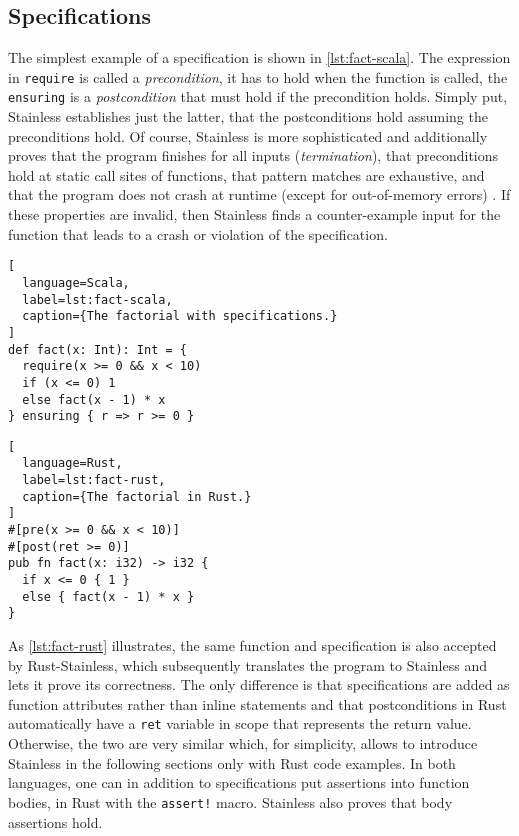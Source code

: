 \subsection{Specifications}

The simplest example of a specification is shown in \autoref{lst:fact-scala}.
The expression in \lstinline!require! is called a \emph{precondition}, it has to
hold when the function is called, the \lstinline!ensuring! is a
\emph{postcondition} that must hold if the precondition holds. Simply put,
Stainless establishes just the latter, that the postconditions hold assuming the
preconditions hold. Of course, Stainless is more sophisticated and additionally
proves that the program finishes for all inputs (\emph{termination}), that
preconditions hold at static call sites of functions, that pattern matches are
exhaustive, and that the program does not crash at runtime (except for
out-of-memory errors) \cite{stainless-doc}. If these properties are invalid,
then Stainless finds a counter-example input for the function that leads to a
crash or violation of the specification.

\noindent\begin{minipage}[t]{.47\textwidth}
\begin{lstlisting}[
  language=Scala,
  label=lst:fact-scala,
  caption={The factorial with specifications.}
]
def fact(x: Int): Int = {
  require(x >= 0 && x < 10)
  if (x <= 0) 1
  else fact(x - 1) * x
} ensuring { r => r >= 0 }
\end{lstlisting}
\end{minipage}\hfill
\begin{minipage}[t]{.47\textwidth}
\begin{lstlisting}[
  language=Rust,
  label=lst:fact-rust,
  caption={The factorial in Rust.}
]
#[pre(x >= 0 && x < 10)]
#[post(ret >= 0)]
pub fn fact(x: i32) -> i32 {
  if x <= 0 { 1 }
  else { fact(x - 1) * x }
}
\end{lstlisting}
\end{minipage}

As \autoref{lst:fact-rust} illustrates, the same function and specification is
also accepted by Rust-Stainless, which subsequently translates the program to
Stainless and lets it prove its correctness. The only difference is that
specifications are added as function attributes rather than inline statements
and that postconditions in Rust automatically have a \lstinline!ret! variable in
scope that represents the return value. Otherwise, the two are very similar
which, for simplicity, allows to introduce Stainless in the following sections
only with Rust code examples. In both languages, one can in addition to
specifications put assertions into function bodies, in Rust with the
\lstinline"assert!" macro. Stainless also proves that body assertions hold.

